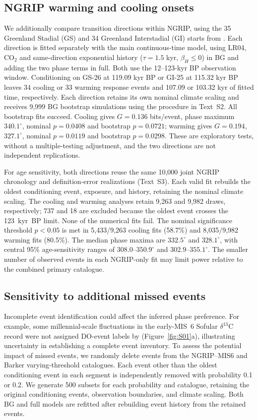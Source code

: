 \documentclass[11pt]{article}
\begin{document}
\subsection*{NGRIP warming and cooling onsets}

We additionally compare transition directions within NGRIP, using the 35 Greenland Stadial (GS) and 34 Greenland Interstadial (GI) starts from \citet{rasmussen2014stratigraphic}. Each direction is fitted separately with the main continuous-time model, using LR04, CO$_2$ and same-direction exponential history ($\tau=1.5$ kyr, $\beta_H\leq0$) in BG and adding the two phase terms in full. Both use the 12--123-kyr BP observation window. Conditioning on GS-26 at 119.09 kyr BP or GI-25 at 115.32 kyr BP leaves 34 cooling or 33 warming response events and 107.09 or 103.32 kyr of fitted time, respectively. Each direction retains its own nominal climate scaling and receives 9,999 BG bootstrap simulations using the procedure in Text~S2. All bootstrap fits succeed. Cooling gives $G=0.136$ bits/event, phase maximum $340.1^\circ$, nominal $p=0.0408$ and bootstrap $p=0.0721$; warming gives $G=0.194$, $327.1^\circ$, nominal $p=0.0119$ and bootstrap $p=0.0298$. These are exploratory tests, without a multiple-testing adjustment, and the two directions are not independent replications.

For age sensitivity, both directions reuse the same 10,000 joint NGRIP chronology and definition-error realizations (Text~S3). Each valid fit rebuilds the oldest conditioning event, exposure, and history, retaining the nominal climate scaling. The cooling and warming analyses retain 9,263 and 9,982 draws, respectively; 737 and 18 are excluded because the oldest event crosses the 123~kyr~BP limit. None of the numerical fits fail. The nominal significance threshold $p<0.05$ is met in 5,433/9,263 cooling fits (58.7\%) and 8,035/9,982 warming fits (80.5\%). The median phase maxima are $332.5^\circ$ and $328.1^\circ$, with central 95\% age-sensitivity ranges of $308.0$--$350.9^\circ$ and $302.9$--$355.1^\circ$. The smaller number of observed events in each NGRIP-only fit may limit power relative to the combined primary catalogue.

\subsection*{Sensitivity to additional missed events}

Incomplete event identification could affect the inferred phase preference. For example, some millennial-scale fluctuations in the early-MIS~6 Sofular $\delta^{13}$C record were not assigned DO-event labels by \citet{held2024dansgaard} (Figure~\ref{fig:S01}a), illustrating uncertainty in establishing a complete event inventory. To assess the potential impact of missed events, we randomly delete events from the NGRIP--MIS6 and Barker varying-threshold catalogues. Each event other than the oldest conditioning event in each segment is independently removed with probability 0.1 or 0.2. We generate 500 subsets for each probability and catalogue, retaining the original conditioning events, observation boundaries, and climate scaling. Both BG and full models are refitted after rebuilding event history from the retained events.
\end{document}
